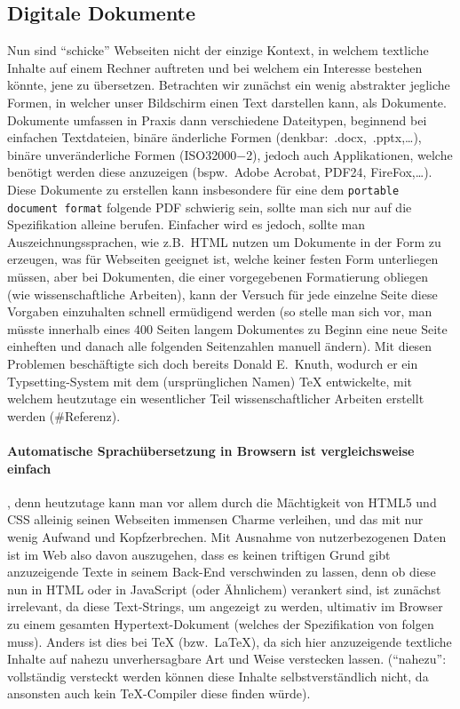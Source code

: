 \subsection{Digitale Dokumente}
Nun sind \enquote{schicke} Webseiten nicht der einzige Kontext, in welchem textliche Inhalte auf einem Rechner auftreten und bei welchem ein Interesse bestehen könnte, jene zu übersetzen. Betrachten wir zunächst ein wenig abstrakter jegliche Formen, in welcher unser Bildschirm einen Text darstellen kann, als Dokumente. Dokumente umfassen in Praxis dann verschiedene Dateitypen, beginnend bei einfachen Textdateien, binäre änderliche Formen (denkbar:~.docx,~.pptx,\ldots), binäre unveränderliche Formen (ISO32000$-$2), jedoch auch Applikationen, welche benötigt werden diese anzuzeigen (bspw.\ Adobe Acrobat, PDF24, FireFox,\ldots). Diese Dokumente zu erstellen kann insbesondere für eine dem \texttt{portable document format} folgende PDF schwierig sein, sollte man sich nur auf die Spezifikation alleine berufen. Einfacher wird es jedoch, sollte man Auszeichnungssprachen, wie z.B.\ HTML nutzen um Dokumente in der Form zu erzeugen, was für Webseiten geeignet ist, welche keiner festen Form unterliegen müssen, aber bei Dokumenten, die einer vorgegebenen Formatierung obliegen (wie wissenschaftliche Arbeiten), kann der Versuch für jede einzelne Seite diese Vorgaben einzuhalten schnell ermüdigend werden (so stelle man sich vor, man müsste innerhalb eines 400 Seiten langem Dokumentes zu Beginn eine neue Seite einheften und danach alle folgenden Seitenzahlen manuell ändern). Mit diesen Problemen beschäftigte sich doch bereits Donald E.\ Knuth, wodurch er ein Typsetting-System mit dem (ursprünglichen Namen) \TeX{} entwickelte\citep{texbook}, mit welchem heutzutage ein wesentlicher Teil wissenschaftlicher Arbeiten erstellt werden (#Referenz).

\paragraph{Automatische Sprachübersetzung in Browsern ist vergleichsweise einfach}, denn heutzutage kann man vor allem durch die Mächtigkeit von HTML5 und CSS alleinig seinen Webseiten immensen Charme verleihen, und das mit nur wenig Aufwand und Kopfzerbrechen. Mit Ausnahme von nutzerbezogenen Daten ist im Web also davon auszugehen, dass es keinen triftigen Grund gibt anzuzeigende Texte in seinem Back-End verschwinden zu lassen, denn ob diese nun in HTML oder in JavaScript (oder Ähnlichem) verankert sind, ist zunächst irrelevant, da diese Text-Strings, um angezeigt zu werden, ultimativ im Browser zu einem gesamten Hypertext-Dokument (welches der Spezifikation von\cite{whatwg:htmlstandard} folgen muss). Anders ist dies bei \TeX{} (bzw.\ \LaTeX{}), da sich hier anzuzeigende textliche Inhalte auf nahezu unverhersagbare Art und Weise verstecken lassen. (\enquote{nahezu}: vollständig versteckt werden können diese Inhalte selbstverständlich nicht, da ansonsten auch kein \TeX{}-Compiler diese finden würde).
